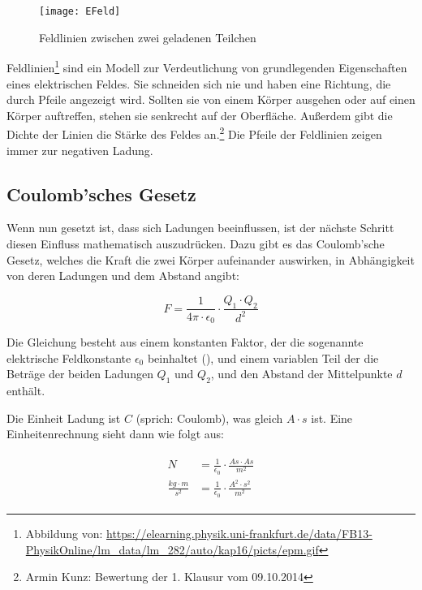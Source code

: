\begin{figure}
	\centering
	\texttt{[image: EFeld]}
	\caption{Feldlinien zwischen zwei geladenen Teilchen}
\end{figure}

Feldlinien\footnote{Abbildung von: \url{https://elearning.physik.uni-frankfurt.de/data/FB13-PhysikOnline/lm_data/lm_282/auto/kap16/picts/epm.gif}} sind ein Modell zur Verdeutlichung von grundlegenden Eigenschaften eines elektrischen Feldes. Sie schneiden sich nie und haben eine Richtung, die durch Pfeile angezeigt wird. Sollten sie von einem Körper ausgehen oder auf einen Körper auftreffen, stehen sie senkrecht auf der Oberfläche. Außerdem gibt die Dichte der Linien die Stärke des Feldes an.\footnote{Armin Kunz: Bewertung der 1. Klausur vom 09.10.2014} Die Pfeile der Feldlinien zeigen immer zur negativen Ladung.


\subsection{Coulomb'sches Gesetz} \label{subsec:CoulombGesetz}

Wenn nun gesetzt ist, dass sich Ladungen beeinflussen, ist der nächste Schritt diesen \glqq Einfluss\grqq{} mathematisch auszudrücken. Dazu gibt es das Coulomb'sche Gesetz, welches die Kraft die zwei Körper aufeinander auswirken, in Abhängigkeit von deren Ladungen und dem Abstand angibt:

\begin{equation} \label{eq:coulomb_gesetz}
	F = \frac{1}{4\pi \cdot \epsilon_0} \cdot \frac{Q_1 \cdot Q_2}{d^{2}}
\end{equation}

Die Gleichung besteht aus einem konstanten Faktor, der die sogenannte \glqq elektrische Feldkonstante\grqq{} $\epsilon_0$ beinhaltet (), und einem variablen Teil der die Beträge der beiden Ladungen $Q_1$ und $Q_2$, und den Abstand der Mittelpunkte $d$ enthält.

Die Einheit Ladung ist $C$ (sprich: Coulomb), was gleich $A \cdot s$ ist. Eine Einheitenrechnung sieht dann wie folgt aus:

\begin{align}\label{eq:coulomb_gesetz_einheiten}
\begin{split}
	N 							&= \frac{1}{\epsilon_0} \cdot \frac{As \cdot As}{m^{2}} \\
	\frac{kg \cdot m}{s^{2}} 	&= \frac{1}{\epsilon_0} \cdot \frac{A^{2} \cdot s^{2}}{m^{2}}
\end{split}
\end{align}

